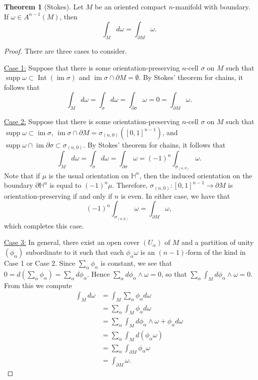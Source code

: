 \documentclass[10pt,letterpaper,cm]{nupset}
\theoremstyle{definition}
\theoremstyle{theorem}
\newtheorem{theorem}[definition]{Theorem}
\theoremstyle{remark}
\renewcommand{\H}{\mathbb H}
\newcommand{\1}{\mathbf{1}}
\newcommand{\0}{\vec 0}
\DeclareMathOperator{\im}{im}
\DeclareMathOperator{\Int}{Int}
\DeclareMathOperator{\supp}{supp}
\begin{document}
\begin{theorem}[Stokes]
Let $M$ be an oriented compact $n$-manifold with boundary. If $\omega \in A^{n-1}(M)$, then $$ \int_M d\omega = \int_{\partial{M}} \omega  .$$
\end{theorem}
\begin{proof} There are three cases to consider.

\medskip


\underline{Case 1:} Suppose that there is some orientation-preserving $n$-cell $\sigma$ on $M$ such that $\supp \omega \subset \Int(\im \sigma)$ and $\im \sigma \cap \partial{M} =\emptyset$. By Stokes' theorem for chains, it follows that $$\int_M d\omega  = \int_{\sigma} d\omega = \int_{\partial{\sigma}} \omega = 0 = \int_{\partial{M}} \omega    .$$

\medskip


\underline{Case 2:} Suppose that there is some orientation-preserving $n$-cell $\sigma$ on $M$ such that $\supp \omega \subset  \im \sigma$, $\im \sigma \cap \partial{M} =\sigma_{(n,0)}([0,1]^{n-1})$, and $\supp \omega \cap \im \partial{\sigma} \subset \sigma_{(n,0)}$. By Stokes' theorem for chains, it follows that $$\int_M d\omega  = \int_{\sigma} d\omega = \int_{\partial{\sigma}} \omega = ({-}1)^n \int_{\sigma_{(n,0)}} \omega .$$ Note that if $\mu$ is the usual orientation on $\H^n$, then the induced orientation on the boundary $\partial{\H^n}$ is equal to $({-}1)^n \mu$. Therefore, $\sigma_{(n,0)} : [0,1]^{n-1}\to \partial{M}$ is orientation-preserving  if and only if $n$ is even. In either case, we have that $$({-}1)^n \int_{\sigma_{(n,0)}} \omega = \int_{\partial{M}} \omega  ,$$ which completes this case.

\medskip


\underline{Case 3:} In general, there exist an open cover $(U_{\alpha})$ of $M$ and a partition of unity $(\phi_{\alpha})$ subordinate to it such that each $\phi_{\alpha}\omega$ is an $(n-1)$-form of the kind in Case 1 or Case 2. Since $\sum_{\alpha} \phi_{\alpha}$ is constant, we see that $0 = d\left(\sum_{\alpha} \phi_{\alpha} \right) = \sum_{\alpha} d \phi_{\alpha}$. Hence $ \sum_{\alpha} d \phi_{\alpha} \wedge \omega =0$, so that $\sum_{\alpha} \int_M d\phi_{\alpha} \wedge \omega =0$. From this we compute
\begin{align*}
 \int_M d\omega & = \int_M \sum_{\alpha} \phi_{\alpha} d\omega 
 \\ & = \sum_{\alpha}\int_M \phi_{\alpha} d\omega
\\ & =  \sum_{\alpha}\int_M d\phi_{\alpha} \wedge \omega + \phi_{\alpha} d\omega 
\\ & =  \sum_{\alpha}\int_M d(\phi_{\alpha} \omega)
\\ & = \sum_{\alpha} \int_{\partial{M}} \phi_{\alpha} \omega 
\\ & =  \int_{\partial{M}} \omega .
\end{align*}
\end{proof}
\end{document}
